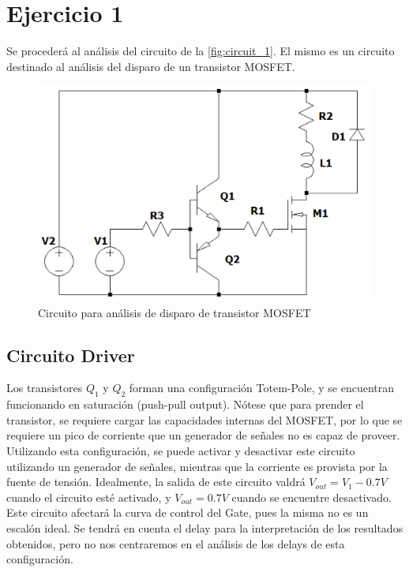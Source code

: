 \documentclass[e4_tp1_main.tex]{subfiles}
\begin{document}
\section{Ejercicio 1}
Se procederá al análisis del circuito de la \autoref{fig:circuit_1}. El mismo es un circuito destinado al análisis del disparo de un transistor MOSFET.


\begin{figure}[H]
  \includegraphics[width=\linewidth]{images/ej1/circuit_1.png}
  \caption{Circuito para análisis de disparo de transistor MOSFET}
  \label{fig:circuit_1}
\end{figure}

\subsection{Circuito Driver}

Los transistores $Q_1$ y $Q_2$ forman una configuración Totem-Pole, y se encuentran funcionando en saturación (push-pull output). 
Nótese que para prender el transistor, se requiere cargar las capacidades internas del MOSFET, por lo que se requiere un pico de corriente que un generador de señales no es capaz de proveer. Utilizando esta configuración, se puede activar y desactivar este circuito utilizando un generador de señales, mientras que la corriente es provista por la fuente de tensión.
Idealmente, la salida de este circuito valdrá $V_{out} = V_1 - 0.7V$ cuando el circuito esté activado, y $V_{out} = 0.7V$ cuando se encuentre desactivado. Este circuito afectará la curva de control del Gate, pues la misma no es un escalón ideal. Se tendrá en cuenta el delay para la interpretación de los resultados obtenidos, pero no nos centraremos en el análisis de los delays de esta configuración.
\end{document}

